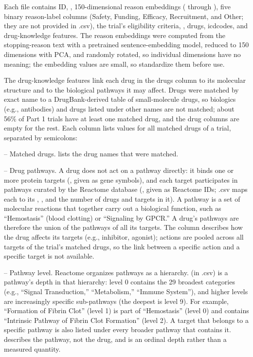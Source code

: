 \documentclass[11pt,letterpaper]{article}
\begin{document}
Each file contains ID, , 150-dimensional reason embeddings ( through
), five binary reason-label columns (Safety, Funding, Efficacy, Recruitment, and
Other; they are not provided in .csv), the trial's eligibility criteria,
, drugs, icdcodes, and drug-knowledge features. The reason embeddings were
computed from the stopping-reason text with a pretrained sentence-embedding model, reduced to 150
dimensions with PCA, and randomly rotated, so individual dimensions have no meaning; the embedding
values are small, so standardize them before use.

The drug-knowledge features link each drug in the drugs column to its molecular structure and to the
biological pathways it may affect. Drugs were matched by exact name to a DrugBank-derived table of
small-molecule drugs, so biologics (e.g., antibodies) and drugs listed under other names are not
matched; about 56\% of Part 1 trials have at least one matched drug, and the drug columns are empty
for the rest. Each column lists values for all matched drugs of a trial, separated by semicolons:

-- Matched drugs.  lists the drug names that were matched.

-- Drug pathways. A drug does not act on a pathway directly: it binds one or more protein targets
(, given as gene symbols), and each target participates in pathways curated by
the Reactome database (, given as Reactome IDs; .csv maps
each  to its , , and the number of drugs
and targets in it). A pathway is a set of molecular reactions that together carry out a biological
function, such as ``Hemostasis'' (blood clotting) or ``Signaling by GPCR.'' A drug's pathways are
therefore the union of the pathways of all its targets. The column  describes how
the drug affects its targets (e.g., inhibitor, agonist); actions are pooled across all targets of
the trial's matched drugs, so the link between a specific action and a specific target is not
available.

-- Pathway level. Reactome organizes pathways as a hierarchy.  (in
.csv) is a pathway's depth in that hierarchy: level 0 contains the 29 broadest
categories (e.g., ``Signal Transduction,'' ``Metabolism,'' ``Immune System''), and higher levels are
increasingly specific sub-pathways (the deepest is level 9). For example, ``Formation of Fibrin
Clot'' (level 1) is part of ``Hemostasis'' (level 0) and contains ``Intrinsic Pathway of Fibrin Clot
Formation'' (level 2). A target that belongs to a specific pathway is also listed under every
broader pathway that contains it.  describes the pathway, not the drug, and is
an ordinal depth rather than a measured quantity.
\end{document}
